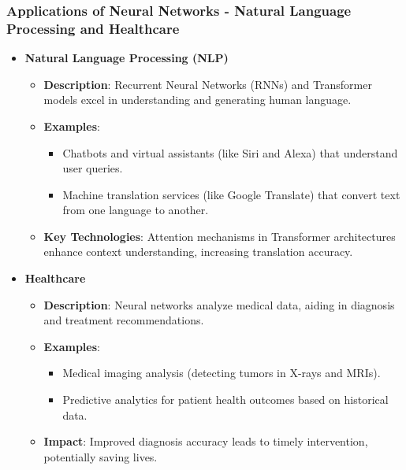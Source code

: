 \documentclass[aspectratio=169]{beamer}
\begin{document}
\begin{frame}[fragile]
    \frametitle{Applications of Neural Networks - Natural Language Processing and Healthcare}
    \begin{itemize}
        \item \textbf{Natural Language Processing (NLP)}
            \begin{itemize}
                \item \textbf{Description}: Recurrent Neural Networks (RNNs) and Transformer models excel in understanding and generating human language.
                \item \textbf{Examples}:
                    \begin{itemize}
                        \item Chatbots and virtual assistants (like Siri and Alexa) that understand user queries.
                        \item Machine translation services (like Google Translate) that convert text from one language to another.
                    \end{itemize}
                \item \textbf{Key Technologies}: Attention mechanisms in Transformer architectures enhance context understanding, increasing translation accuracy.
            \end{itemize}

        \item \textbf{Healthcare}
            \begin{itemize}
                \item \textbf{Description}: Neural networks analyze medical data, aiding in diagnosis and treatment recommendations.
                \item \textbf{Examples}:
                    \begin{itemize}
                        \item Medical imaging analysis (detecting tumors in X-rays and MRIs).
                        \item Predictive analytics for patient health outcomes based on historical data.
                    \end{itemize}
                \item \textbf{Impact}: Improved diagnosis accuracy leads to timely intervention, potentially saving lives.
            \end{itemize}
    \end{itemize}
\end{frame}
\end{document}
